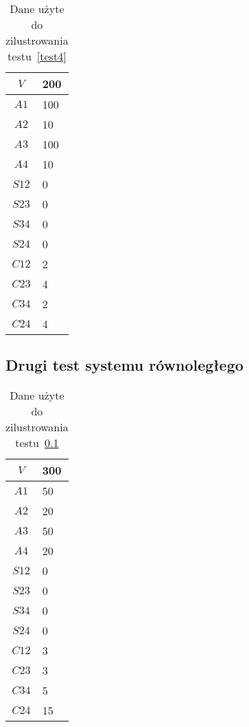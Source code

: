 \begin{table}[H]
\centering
\begin{tabular}{|c|l|}
\hline
$V$ & 200 \\ \hline
$A1$ & 100 \\ \hline
$A2$ & 10 \\ \hline
$A3$ & 100 \\ \hline
$A4$ & 10 \\ \hline
$S12$ & 0 \\ \hline
$S23$ & 0 \\ \hline
$S34$ & 0 \\ \hline
$S24$ & 0 \\ \hline
$C12$ & 2 \\ \hline
$C23$ & 4 \\ \hline
$C34$ & 2 \\ \hline
$C24$ & 4 \\ \hline
\end{tabular}
\caption{Dane użyte do zilustrowania testu~\ref{test4}}
\label{tab:res_4}
\end{table}

\subsection{Drugi test systemu równoległego} \label{test5}

\begin{table}[H]
\centering
\begin{tabular}{|c|l|}
\hline
$V$ & 300 \\ \hline
$A1$ & 50 \\ \hline
$A2$ & 20 \\ \hline
$A3$ & 50 \\ \hline
$A4$ & 20 \\ \hline
$S12$ & 0 \\ \hline
$S23$ & 0 \\ \hline
$S34$ & 0 \\ \hline
$S24$ & 0 \\ \hline
$C12$ & 3 \\ \hline
$C23$ & 3 \\ \hline
$C34$ & 5 \\ \hline
$C24$ & 15 \\ \hline
\end{tabular}
\caption{Dane użyte do zilustrowania testu~\ref{test5}}
\label{tab:res_5}
\end{table}

\newpage
